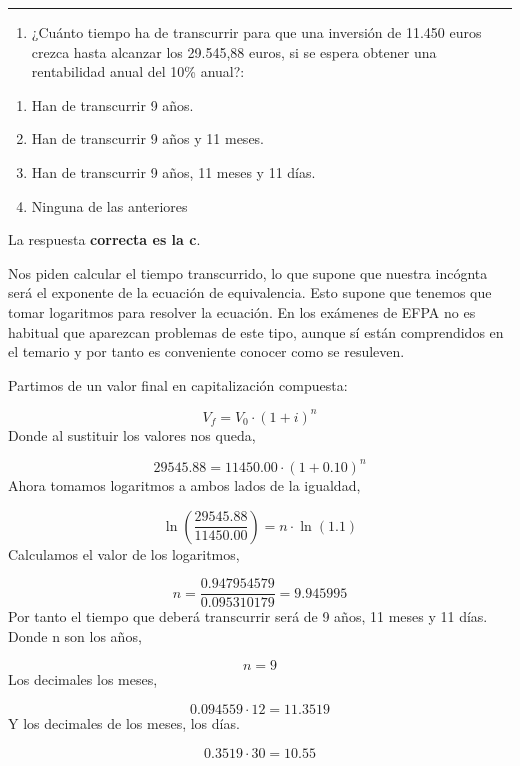 \documentclass[
  letterpaper,
  DIV=11,
  numbers=noendperiod]{scrreprt}
\providecommand{\tightlist}{%
  \setlength{\itemsep}{0pt}\setlength{\parskip}{0pt}}\usepackage{longtable,booktabs,array}
\begin{document}
\begin{center}\rule{0.5\linewidth}{0.5pt}\end{center}

\begin{enumerate}
\def\labelenumi{\arabic{enumi}.}
\setcounter{enumi}{61}
\tightlist
\item
  ¿Cuánto tiempo ha de transcurrir para que una inversión de 11.450
  euros crezca hasta alcanzar los 29.545,88 euros, si se espera obtener
  una rentabilidad anual del 10\% anual?:
\end{enumerate}

\begin{enumerate}
\def\labelenumi{\alph{enumi}.}
\item
  Han de transcurrir 9 años.
\item
  Han de transcurrir 9 años y 11 meses.
\item
  Han de transcurrir 9 años, 11 meses y 11 días.
\item
  Ninguna de las anteriores
\end{enumerate}

\begin{tcolorbox}[enhanced jigsaw, left=2mm, opacityback=0, colback=white, breakable, arc=.35mm, bottomrule=.15mm, rightrule=.15mm, toprule=.15mm, leftrule=.75mm, colframe=quarto-callout-tip-color-frame]
\begin{minipage}[t]{5.5mm}
\textcolor{quarto-callout-tip-color}{\faLightbulb}
\end{minipage}%
\begin{minipage}[t]{\textwidth - 5.5mm}

La respuesta \textbf{correcta es la c}.

Nos piden calcular el tiempo transcurrido, lo que supone que nuestra
incógnta será el exponente de la ecuación de equivalencia. Esto supone
que tenemos que tomar logaritmos para resolver la ecuación. En los
exámenes de EFPA no es habitual que aparezcan problemas de este tipo,
aunque sí están comprendidos en el temario y por tanto es conveniente
conocer como se resuleven.

Partimos de un valor final en capitalización compuesta:

\[V_f=V_0\cdot\left(1+i\right)^n\] Donde al sustituir los valores nos
queda,

\[29545.88=11450.00\cdot\left(1+0.10\right)^n\] Ahora tomamos logaritmos
a ambos lados de la igualdad,

\[\ln\left(\frac{29545.88}{11450.00}\right)=n\cdot\ln\left(1.1\right)\]
Calculamos el valor de los logaritmos,

\[n=\frac{0.947954579}{0.095310179}=9.945995\] Por tanto el tiempo que
deberá transcurrir será de 9 años, 11 meses y 11 días. Donde n son los
años,

\[n=9\] Los decimales los meses,

\[0.094559\cdot12=11.3519\] Y los decimales de los meses, los días.

\[0.3519\cdot30=10.55\]

\end{minipage}%
\end{tcolorbox}
\end{document}

